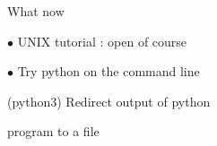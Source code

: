 \documentclass[a4paper,portrait,12pt]{article}
\begin{document}
\begin{flushleft}
\newpage
What now
\end{flushleft}


\begin{flushleft}
$\bullet$ UNIX tutorial : open of course
\end{flushleft}


\begin{flushleft}
$\bullet$ Try python on the command line
\end{flushleft}


\begin{flushleft}
(python3) Redirect output of python
\end{flushleft}


\begin{flushleft}
program to a file
\end{flushleft}





\newpage
\end{document}
